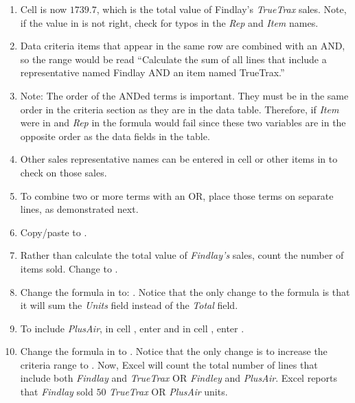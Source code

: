 \begin{enumbox}
\begin{enumerate}
		\item Cell  is now $ 1739.7 $, which is the total value of Findlay's \textit{TrueTrax} sales. Note, if the value in  is not right, check for typos in the \textit{Rep} and \textit{Item} names.
		\item Data criteria items that appear in the same row are combined with an AND, so the range  would be read ``Calculate the sum of all lines that include a representative named Findlay AND an item named TrueTrax.''
		\item Note: The order of the ANDed terms is important. They must be in the same order in the criteria section as they are in the data table. Therefore, if \textit{Item} were in  and \textit{Rep} in  the formula would fail since these two variables are in the opposite order as the data fields in the table.
		\item Other sales representative names can be entered in cell  or other items in  to check on those sales.
		\item To combine two or more terms with an OR, place those terms on separate lines, as demonstrated next.
		\item Copy/paste  to .
		\item Rather than calculate the total value of \textit{Findlay's} sales, count the number of items sold. Change  to .
		\item Change the formula in  to: . Notice that the only change to the formula is that it will sum the \textit{Units} field instead of the \textit{Total} field.
		\item To include \textit{PlusAir}, in cell , enter  and in cell , enter .
		\item Change the formula in  to . Notice that the only change is to increase the criteria range to . Now, Excel will count the total number of lines that include both \textit{Findlay} and \textit{TrueTrax} OR \textit{Findley} and \textit{PlusAir}. Excel reports that \textit{Findlay} sold $ 50 $ \textit{TrueTrax} OR \textit{PlusAir} units.
		
	\end{enumerate}
\end{enumbox}


